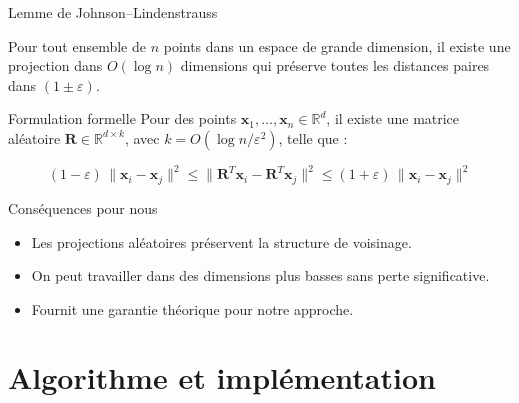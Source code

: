\documentclass[9pt,aspectratio=169,professionalfonts]{beamer}
\begin{document}
\begin{frame}{Lemme de Johnson–Lindenstrauss}
\begin{theorem}
Pour tout ensemble de $n$ points dans un espace de grande dimension, il existe une projection dans $O(\log n)$ dimensions qui préserve toutes les distances paires dans $(1\pm\varepsilon)$.
\end{theorem}

\begin{block}{Formulation formelle}
Pour des points $\mathbf{x}_1,\dots, \mathbf{x}_n \in \mathbb R^d$, il existe une matrice aléatoire $\mathbf R \in \mathbb R^{d\times k}$, avec $k = O(\log n/\varepsilon^2)$, telle que :

$$\boxed{(1-\varepsilon)\,\lVert\mathbf x_i-\mathbf x_j\rVert^2 \le \lVert\mathbf R^T\mathbf x_i-\mathbf R^T\mathbf x_j\rVert^2 \le (1+\varepsilon)\,\lVert\mathbf x_i-\mathbf x_j\rVert^2}$$
\end{block}

\begin{block}{Conséquences pour nous}
\begin{itemize}
    \item Les projections aléatoires préservent la structure de voisinage.
    \item On peut travailler dans des dimensions plus basses sans perte significative.
    \item Fournit une garantie théorique pour notre approche.
\end{itemize}
\end{block}
\end{frame}

\section{Algorithme et implémentation}
\end{document}
